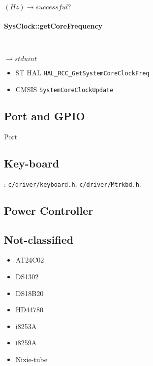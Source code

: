 

$(Hz) \rightarrow successful?$

\paragraph{SysClock::getCoreFrequency} \


$\rightarrow stduint$

\begin{itemize}
\item ST HAL \verb`HAL_RCC_GetSystemCoreClockFreq`
\item CMSIS \verb`SystemCoreClockUpdate`
\end{itemize}



\subsection{Port and GPIO}
{Port}

\subsection{Key-board}
: \verb`c/driver/keyboard.h`, \verb`c/driver/Mtrkbd.h`.

\subsection{Power Controller}

\subsection{Not-classified}
\begin{itemize}
\item AT24C02
\item DS1302
\item DS18B20
\item HD44780
\item i8253A
\item i8259A
\item Nixie-tube
\end{itemize}


